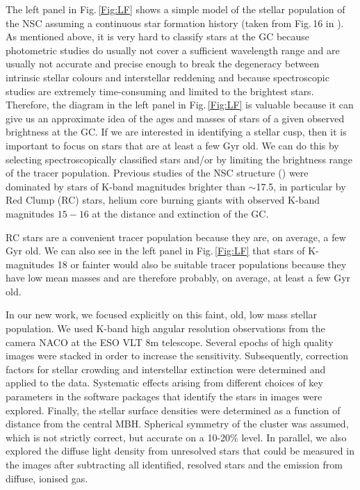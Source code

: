 \documentclass[a4paper]{jpconf}
\begin{document}
The left panel in Fig.\,\ref{Fig:LF} shows a simple model of the
stellar population of the NSC
assuming a continuous star formation history (taken from Fig.\,16 in
\cite{Schodel:2007tw}). As mentioned above, it is very hard to
classify stars at the GC because photometric studies do usually not
cover a sufficient wavelength range and are usually not accurate and
precise enough to break the degeneracy between intrinsic stellar
colours and interstellar reddening and because spectroscopic studies
are extremely time-consuming and limited to the brightest
stars. Therefore, the diagram in the left panel in Fig.\,\ref{Fig:LF} is
valuable because it can give us an approximate idea of the ages and
masses of stars of a given observed brightness at the GC. If we are
interested in identifying a stellar cusp, then it is important to
focus on stars that are at least a few Gyr old. We can do this by selecting
spectroscopically classified stars and/or by limiting the brightness
range of the tracer population.  Previous studies of the NSC structure
(\cite{Buchholz:2009fk,Do:2009tg,Bartko:2010fk}) were dominated by
stars of K-band magnitudes brighter than $\sim$17.5, in particular by
Red Clump (RC) stars, helium core burning giants with observed K-band
magnitudes $15-16$ at the distance and extinction of the GC. 

RC stars are a convenient tracer population because they are, on
average, a few Gyr old. We can also see in the left panel in
Fig.\,\ref{Fig:LF} that stars of K-magnitudes 18 or fainter would also
be suitable tracer populations because they have low mean masses and
are therefore probably, on average, at least a few Gyr old.

In our new work, we focused explicitly on this faint, old, low mass
stellar population. We used K-band high angular resolution
observations from the camera NACO at the ESO VLT 8m telescope. Several
epochs of high quality images were stacked in order to increase the
sensitivity. Subsequently, correction factors for stellar crowding and
interstellar extinction were determined and applied to the
data. Systematic effects arising from different choices of key
parameters in the software packages that identify the stars in images
were explored. Finally, the stellar surface densities were determined
as a function of distance from the central MBH. Spherical symmetry of
the cluster was assumed, which is not strictly correct, but accurate
on a 10-20\% level. In parallel, we also explored the diffuse light
density from unresolved stars that could be measured in the images
after subtracting all identified, resolved stars and the emission from
diffuse, ionised gas. 
\end{document}
